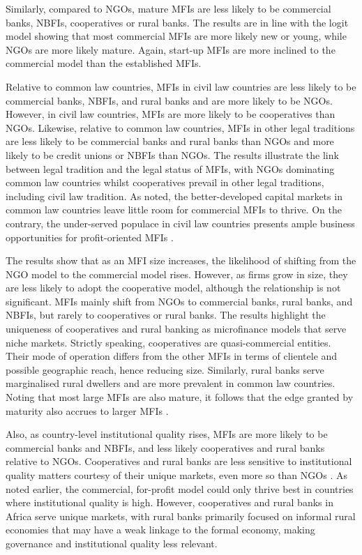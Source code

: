 \documentclass[a4paper,nobind]{templates/ociamthesis}
\begin{document}
Similarly, compared to NGOs, mature MFIs are less likely to be commercial banks, NBFIs, cooperatives or rural banks. The results are in line with the logit model showing that most commercial MFIs are more likely new or young, while NGOs are more likely mature. Again, start-up MFIs are more inclined to the commercial model than the established MFIs.

Relative to common law countries, MFIs in civil law countries are less likely to be commercial banks, NBFIs, and rural banks and are more likely to be NGOs. However, in civil law countries, MFIs are more likely to be cooperatives than NGOs. Likewise, relative to common law countries, MFIs in other legal traditions are less likely to be commercial banks and rural banks than NGOs and more likely to be credit unions or NBFIs than NGOs. The results illustrate the link between legal tradition and the legal status of MFIs, with NGOs dominating common law countries whilst cooperatives prevail in other legal traditions, including civil law tradition. As noted, the better-developed capital markets in common law countries leave little room for commercial MFIs to thrive. On the contrary, the under-served populace in civil law countries presents ample business opportunities for profit-oriented MFIs \autocite{d2013unsubsidized,mia2017mission}.

The results show that as an MFI size increases, the likelihood of shifting from the NGO model to the commercial model rises. However, as firms grow in size, they are less likely to adopt the cooperative model, although the relationship is not significant. MFIs mainly shift from NGOs to commercial banks, rural banks, and NBFIs, but rarely to cooperatives or rural banks. The results highlight the uniqueness of cooperatives and rural banking as microfinance models that serve niche markets. Strictly speaking, cooperatives are quasi-commercial entities. Their mode of operation differs from the other MFIs in terms of clientele and possible geographic reach, hence reducing size. Similarly, rural banks serve marginalised rural dwellers and are more prevalent in common law countries. Noting that most large MFIs are also mature, it follows that the edge granted by maturity also accrues to larger MFIs \autocite{beck2014sme,kersten2017small}.

Also, as country-level institutional quality rises, MFIs are more likely to be commercial banks and NBFIs, and less likely cooperatives and rural banks relative to NGOs. Cooperatives and rural banks are less sensitive to institutional quality matters courtesy of their unique markets, even more so than NGOs \autocite{sobel2008testing}. As noted earlier, the commercial, for-profit model could only thrive best in countries where institutional quality is high. However, cooperatives and rural banks in Africa serve unique markets, with rural banks primarily focused on informal rural economies that may have a weak linkage to the formal economy, making governance and institutional quality less relevant.
\end{document}
